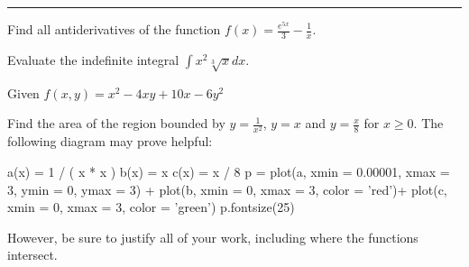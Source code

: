 \documentclass[12pt]{exam}
\newcommand{\compressspacing}[1]{\ifdefined\compresseddocument\relax\else#1\fi}
\newcommand{\elasticvfill}{\compressspacing{\vfill}}
\newcommand{\elasticnewpage}{\compressspacing{\newpage}}
\begin{document}
\fi

\rule[1ex]{\textwidth}{.1pt} 

\elasticnewpage

\begin{questions}

\question[5]
Find all antiderivatives of the function $f(x) = \displaystyle\frac{e^{5x}}{3}-\frac{1}{x}$.

\elasticvfill

\question[5] 
Evaluate the indefinite integral $\displaystyle \int x^2 \sqrt[3]{x}dx$.

\elasticvfill

\elasticnewpage

\noaddpoints \question[10] \addpoints
Given $\displaystyle f(x,y) = x^2-4xy+10x-6y^2$

\elasticnewpage

\question[15] Find the area of the region bounded by $y = \frac{1}{x^2}$, $y=x$ and $y = \frac{x}{8}$ for $x\geq 0$. The following diagram may prove helpful:
\begin{sagesilent}
    a(x) =  1 / ( x * x )
    b(x) = x
    c(x) = x / 8
    p = plot(a, xmin = 0.00001, xmax = 3, ymin = 0, ymax = 3) + plot(b, xmin = 0, xmax = 3, color = 'red')+ plot(c, xmin = 0, xmax = 3, color = 'green')
    p.fontsize(25)
\end{sagesilent}

\begin{center}
\end{center}
However, be sure to justify all of your work, including where the functions intersect.

\elasticvfill

\end{questions}
\end{document}
